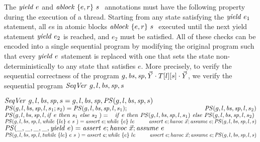 The $\mathit{yield}\ e$ and $\mathit{ablock}\ {\{e,r\}}\ {s}\ $ annotations must have the following property during the execution of a thread. Starting from any state satisfying the $\mathit{yield}\ e_1$ statement, all $e$s in atomic blocks $\mathit{ablock}\ {\{e,r\}}\ {s}\ $ executed until the next yield statement $\mathit{yield}\ e_2$ is reached, and $e_2$ must be satisfied. All of these checks can be encoded into a single sequential program by modifying the original program such that every $\mathit{yield}\ e$ statement is replaced with one that sets the state non-deterministically to any state that satisfies $e$. More precisely, to verify the sequential correctness of the program $g, \mathit{bs}, \mathit{sp}, \vec{Y} \cdot T[l][s] \cdot \vec{Y}$, we verify the sequential program ${\mathit{SeqVer}\ } g, l, \mathit{bs}, \mathit{sp}, s$

\noindent
${\mathit{SeqVer}\ } g, l, \mathit{bs}, \mathit{sp}, s = g, l, \mathit{bs}, \mathit{sp},
                                                                         \mathit{PS}(g, l, \mathit{bs}, \mathit{sp},s)$\\
$\SeqProcStmt(\varsG, \varsL, \bodies, \specs, l, s_1; s_2) =  \SeqProcStmt(\varsG, \varsL, \bodies, \specs, l, s_1); \\
                                                                                      \hspace*{4.3cm}   \SeqProcStmt(\varsG, \varsL, \bodies, \specs, l, s_2)$\\
$\mathit{PS}(g, l, \mathit{bs}, \mathit{sp}, l, {\mathit{if}\ {e}\ }{\mathit{then}\ {s_1}\ }{\mathit{else}\ { s_2}\ }) =  \\
\hspace*{0.3cm} {\mathit{if}\ {e}\ }{\mathit{then}\ {\mathit{PS}(g, l, \mathit{bs}, \mathit{sp}, l, s_1)}\ }{\mathit{else}\ {\mathit{PS}(g, l, \mathit{bs}, \mathit{sp}, l, s_2)}\ }$\\
$\mathit{PS}(g, l, \mathit{bs}, \mathit{sp}, l, \mathit{while}\ \{{le}\}\ {{e}\ } {{s}\ }) =  \\
\mathit{assert}\ e; \\
\mathit{while}\ \{{e}\}\ {{le}\ } {{}\ }\\
 \hspace*{0.7cm}{\mathit{assert}\ e; \mathit{havoc}\ \vec{x}; \mathit{assume}\ e; \mathit{PS}(g, l, \mathit{bs}, \mathit{sp}, l, s)}$\\
$\mathit{PS}(\_, \_, \_, \_, \mathit{yield}\ e) =  \mathit{assert}\ e; \mathit{havoc}\ \vec{x}; \mathit{assume}\ e$\\
$\mathit{PS}(g, l, \mathit{bs}, \mathit{sp}, l, \mathit{twhile}\ \{{le}\}\ {{e}\ } {{s}\ }) =  \\
\mathit{assert}\ e; \\
\mathit{while}\ \{{e}\}\ {{le}\ } {{}\ }\\
 \hspace*{0.7cm}{\mathit{assert}\ e; \mathit{havoc}\ \vec{x}; \mathit{assume}\ e; \mathit{PS}(g, l, \mathit{bs}, \mathit{sp}, l, s)}$\\
